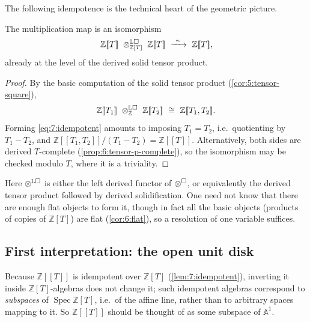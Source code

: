 The following idempotence is the technical heart of the geometric picture.

\begin{lemma}
\label{lem:7:idempotent}
The multiplication map is an isomorphism
\begin{equation}
\label{eq:7:idempotent}
\mathbb{Z}[\![T]\!]\ \otimes^{\mathbb{L}\solid}_{\mathbb{Z}[T]}\
\mathbb{Z}[\![T]\!]\ \xrightarrow{\ \sim\ }\ \mathbb{Z}[\![T]\!],
\end{equation}
already at the level of the derived solid tensor product.
\end{lemma}

\begin{proof}
By the basic computation of the solid tensor product (\cref{cor:5:tensor-square}),
\begin{equation}
\label{eq:7:two-variable-power-series}
\mathbb{Z}[\![T_1]\!]\ \otimes^{\mathbb{L}\square}_{\mathbb{Z}}\
\mathbb{Z}[\![T_2]\!]\ \cong\ \mathbb{Z}[\![T_1,T_2]\!].
\end{equation}
Forming \eqref{eq:7:idempotent} amounts to imposing $T_1=T_2$, i.e.\
quotienting by $T_1-T_2$, and $\mathbb{Z}[\![T_1,T_2]\!]/(T_1-T_2)
=\mathbb{Z}[\![T]\!]$. Alternatively, both sides are derived $T$-complete
(\cref{prop:6:tensor-p-complete}), so the isomorphism may be checked modulo
$T$, where it is a triviality.
\end{proof}

\begin{remark}
\label{rmk:7:derived-tensor}
Here $\otimes^{\mathbb{L}\square}$ is either the left derived functor of
$\otimes^{\square}$, or equivalently the derived tensor product followed by
derived solidification. One need not know that there are enough flat objects to
form it, though in fact all the basic objects (products of copies of
$\mathbb{Z}[T]$) are flat (\cref{cor:6:flat}), so a resolution of one variable
suffices.
\end{remark}

\subsection{First interpretation: the open unit disk}

Because $\mathbb{Z}[\![T]\!]$ is idempotent over $\mathbb{Z}[T]$
(\cref{lem:7:idempotent}), inverting it inside $\mathbb{Z}[T]$-algebras does
not change it; such idempotent algebras correspond to \emph{subspaces} of
$\operatorname{Spec}\mathbb{Z}[T]$, i.e.\ of the affine line, rather than to
arbitrary spaces mapping to it. So $\mathbb{Z}[\![T]\!]$ should be thought of
as some subspace of $\mathbb{A}^1$.

